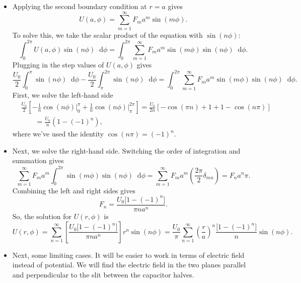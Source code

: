 \documentclass[11pt, a4paper]{article}
\newcommand{\diff}{\mathop{}\!\mathrm{d}} %
\begin{document}
\begin{itemize}
	\item Applying the second boundary condition at $ r = a $ gives
	\begin{equation*}
		U(a, \phi) = \sum_{m=1}^{\infty} F_{m}a^{m} \sin (m\phi).
	\end{equation*} 
	To solve this, we take the scalar product of the equation with $ \sin(n \phi) $: 
	\begin{equation*}
		\int_{0}^{2\pi} U(a, \phi)\sin(n \phi) \diff \phi =  \int_{0}^{2\pi} \sum_{m=1}^{\infty} F_{m}a^{m} \sin (m\phi) \sin(n \phi) \diff \phi.
	\end{equation*}
	Plugging in the step values of $ U(a, \phi) $ gives
	\begin{equation*}
		\frac{U_{0}}{2}\int_{0}^{\pi}\sin(n \phi) \diff \phi - \frac{U_{0}}{2}\int_{\pi}^{2\pi}\sin(n \phi) \diff \phi  =  \int_{0}^{2\pi} \sum_{m=1}^{\infty} F_{m}a^{m} \sin (m\phi) \sin(n \phi) \diff \phi.
	\end{equation*}
	First, we solve the left-hand side
	\begin{align*}
		&\frac{U_{0}}{2}\left[-\frac{1}{n}\cos(n\phi)\big |_{0}^{\pi} + \frac{1}{n}\cos (n\phi)\big |_{\pi}^{2\pi} \right] = \frac{U_{0}}{2n}\left[-\cos(\pi n) + 1 + 1 - \cos(n\pi)\right]\\
		&{}\qquad = \frac{U_{0}}{n}\left(1 - (-1)^{n}\right),
	\end{align*}
	where we've used the identity $ \cos(n\pi) = (-1)^{n} $.
	
	\item Next, we solve the right-hand side. Switching the order of integration and summation gives
	\begin{equation*}
		  \sum_{m=1}^{\infty} F_{m}a^{m} \int_{0}^{2\pi}  \sin (m\phi) \sin(n \phi) \diff \phi = \sum_{m=1}^{\infty} F_{m}a^{m}\left (\frac{2\pi}{2}\delta_{mn} \right ) = F_{n}a^{n} \pi.
	\end{equation*}
	Combining the left and right sides gives
	\begin{equation*}
		F_{n} = \frac{U_{0}\big[1 - (-1)^{n}\big]}{\pi n a^{n}}.
	\end{equation*}
	So, the solution for $ U(r, \phi) $ is
	\begin{equation*}
		U(r, \phi) = \sum_{n = 1}^{\infty} \left[\frac{U_{0}\big[1 - (-1)^{n}\big]}{\pi n a^{n}}\right]r^{n}\sin(n\phi) = \frac{U_{0}}{\pi} \sum_{n = 1}^{\infty} \left(\frac{r}{a}\right)^{n} \frac{\big[1 - (-1)^{n}\big]}{n}\sin(n\phi).
	\end{equation*}
	
	\item Next, some limiting cases. It will be easier to work in terms of electric field instead of potential. We will find the electric field in the two planes parallel and perpendicular to the slit between the capacitor halves. 
	

\end{itemize}
\end{document}
